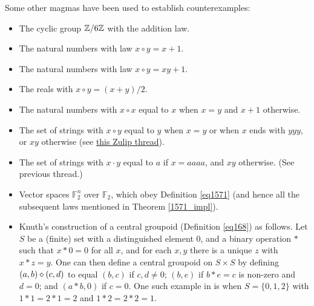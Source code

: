 Some other magmas have been used to establish counterexamples:
\begin{itemize}
  \item The cyclic group $\mathbb{Z}/6\mathbb{Z}$ with the addition law.
  \item The natural numbers with law $x \circ y = x+1$.
  \item The natural numbers with law $x \circ y = xy+1$.
  \item The reals with $x \circ y = (x+y)/2$.
  \item The natural numbers with $x \circ x$ equal to $x$ when $x=y$ and $x+1$ otherwise.
  \item The set of strings with $x \circ y$ equal to $y$ when $x=y$ or when $x$ ends with $yyy$, or $xy$ otherwise (see \href{https://leanprover.zulipchat.com/#narrow/stream/458659-Equational/topic/3102.20does.20not.20imply.203176}{this Zulip thread}).
  \item The set of strings with $x \cdot y$ equal to $a$ if $x=aaaa$, and $xy$ otherwise.  (See previous thread.)
  \item Vector spaces ${\mathbb F}_2^n$ over ${\mathbb F}_2$, which obey Definition \ref{eq1571} (and hence all the subsequent laws mentioned in Theorem \ref{1571_impl}).
  \item Knuth's construction \cite{knuth} of a central groupoid (Definition \ref{eq168}) as follows.  Let $S$ be a (finite) set with a distinguished element $0$, and a binary operation $*$ such that $x*0=0$ for all $x$, and for each $x,y$ there is a unique $z$ with $x*z=y$.  One can then define a central groupoid on $S \times S$ by defining $(a,b) \diamond (c,d)$ to equal $(b,c)$ if $c,d \neq 0$; $(b,e)$ if $b*e=c$ is non-zero and $d=0$; and $(a*b,0)$ if $c=0$.  One such example in \cite{knuth} is when $S = \{0,1,2\}$ with $1*1=2*1=2$ and $1*2=2*2=1$.
\end{itemize}
